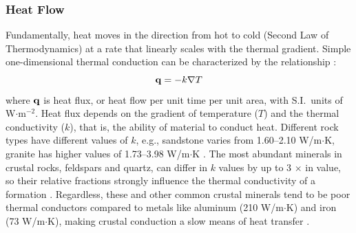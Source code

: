 \subsubsection{Heat Flow}\label{ch2:heatflow}
Fundamentally, heat moves in the direction from hot to cold (Second Law of Thermodynamics) at a rate that linearly scales with the thermal gradient. Simple one-dimensional thermal conduction can be characterized by the relationship \citep[Fourier's Law,][p.\ 270]{fowler_solid_2005}:
\begin{equation}\label{eq:conduction}
    {\bf q} = -k\nabla T
\end{equation}
where ${\bf q}$ is heat flux, or heat flow per unit time per unit area, with S.I.\ units of W$\cdot$m$^{-2}$. Heat flux depends on the gradient of temperature ($T$) and the thermal conductivity ($k$), that is, the ability of material to conduct heat. Different rock types have different values of $k$, e.g., sandstone varies from 1.60--2.10 W/m$\cdot$K, granite has higher values of 1.73--3.98 W/m$\cdot$K \citep[p.\ 30]{dipippo_geothermal_2012}. The most abundant minerals in crustal rocks, feldspars and quartz, can differ in $k$ values by up to 3 $\times$ in value, so their relative fractions strongly influence the thermal conductivity of a formation \citep[p.\ 22]{glassley_geothermal_2015}. Regardless, these and other common crustal minerals tend to be poor thermal conductors compared to metals like aluminum (210 W/m$\cdot$K) and iron (73 W/m$\cdot$K), making crustal conduction a slow means of heat transfer \citep[p.\ 23]{dipippo_geothermal_2012}.

